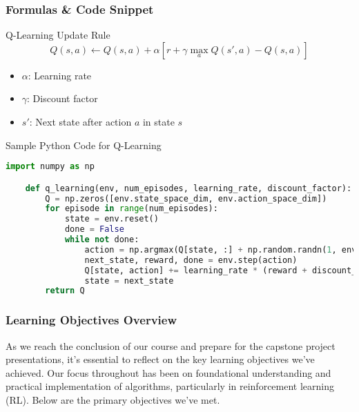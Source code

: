 \documentclass[aspectratio=169]{beamer}
\begin{document}
\begin{frame}[fragile]
    \frametitle{Formulas \& Code Snippet}
    \begin{block}{Q-Learning Update Rule}
        \begin{equation}
            Q(s, a) \leftarrow Q(s, a) + \alpha \left[ r + \gamma \max_a Q(s', a) - Q(s, a) \right]
        \end{equation}
        \begin{itemize}
            \item \(\alpha\): Learning rate
            \item \(\gamma\): Discount factor
            \item \(s'\): Next state after action \(a\) in state \(s\)
        \end{itemize}
    \end{block}
    \begin{block}{Sample Python Code for Q-Learning}
    \begin{lstlisting}[language=Python]
    import numpy as np

    def q_learning(env, num_episodes, learning_rate, discount_factor):
        Q = np.zeros([env.state_space_dim, env.action_space_dim])
        for episode in range(num_episodes):
            state = env.reset()
            done = False
            while not done:
                action = np.argmax(Q[state, :] + np.random.randn(1, env.action_space_dim))
                next_state, reward, done = env.step(action)
                Q[state, action] += learning_rate * (reward + discount_factor * np.max(Q[next_state, :]) - Q[state, action])
                state = next_state
        return Q
    \end{lstlisting}
    \end{block}
\end{frame}

\begin{frame}[fragile]
    \frametitle{Learning Objectives Overview}
    As we reach the conclusion of our course and prepare for the capstone project presentations, it's essential to reflect on the key learning objectives we've achieved. Our focus throughout has been on foundational understanding and practical implementation of algorithms, particularly in reinforcement learning (RL). Below are the primary objectives we've met.
\end{frame}
\end{document}
